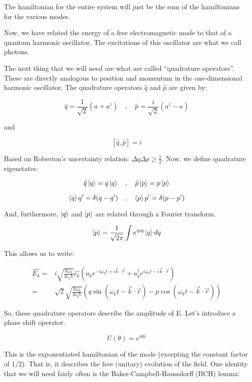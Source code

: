 \documentclass{article}
\begin{document}
The hamiltonian for the entire system will just be the sum of the hamiltonians
for the various modes.

Now, we have related the energy of a free electromagnetic mode to that of a
quantum harmonic oscillator. The excitations of this oscillator are what we
call photons.

The next thing that we will need are what are called ``quadrature operators''.
These are directly analogous to position and momentum in the one-dimensional
harmonic oscillator. The quadrature operators $\hat{q}$ and $\hat{p}$ are given
by:

\[ 
    \hat{q} = \frac{1}{\sqrt{2}} \left( a + a^\dagger \right) \quad,\quad
    \hat{p} = \frac{i}{\sqrt{2}} \left( a^\dagger - a \right)
\]

and

\[ 
    [\hat{q},\hat{p}] = i 
\]

Based on Roberton's uncertainty relation: $\Delta q \Delta p \ge \frac{1}{2}$.
Now, we define quadrature eigenstates:

\[ 
    \hat{q}\ket{q} = q \ket{q} \quad,\quad \hat{p} \ket{p} =p \ket{p}
\]

\[ 
    \braket{q}{q'} = \delta(q-q') \quad,\quad \braket{p}{p'} = \delta(p-p') 
\]

And, furthermore, $\ket{q}$ and $\ket{p}$ are related through a Fourier
transform.

\[ 
    \ket{p} = \frac{1}{\sqrt{2\pi}} \int e^{i p q} \ket{q} dq 
\]

This allows us to write:

\begin{align*} 
    \hat{E_k} =& i \sqrt{\frac{\hbar \omega_k}{2 \epsilon_0 V}} \hat{\epsilon_k}
    \left(a_k e^{-i \omega_k t + i \vec{k}\cdot
\vec{r}} + a_k^\dagger e^{i \omega_k t - i \vec{k} \cdot \vec{r}} \right) \\
=& \sqrt{2} \sqrt{\frac{\hbar \omega_k}{2 \epsilon_0 V}} \left( q \sin(\omega_k
t - \vec{k}\cdot \vec{r}) - p \cos(\omega_k t - \vec{k} \cdot \vec{r}) \right)
\end{align*}

So, these quadrature operators describe the amplitude of E. Let's introduce a
phase shift operator.

\[ 
    U(\theta) = e^{i \theta \hat{n}} 
\]

This is the exponentiated hamiltonian of the mode (excepting the constant factor
of 1/2). That is, it describes the free (unitary) evolution of the field. One
identity that we will need fairly often is the Baker-Campbell-Haussdorff (BCH) lemma:
\end{document}
